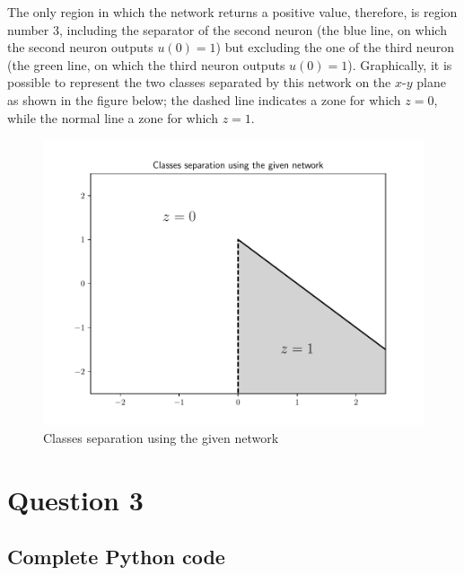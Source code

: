 \documentclass[letterpaper,headings=standardclasses]{scrartcl}
\begin{document}
The only region in which the network returns a positive value, therefore, is region number 3, including the separator of the second neuron (the blue line, on which the second neuron outputs $u(0) = 1$) but excluding the one of the third neuron (the green line, on which the third neuron outputs $u(0) = 1$). Graphically, it is possible to represent the two classes separated by this network on the $x$-$y$ plane as shown in the figure below; the dashed line indicates a zone for which $z = 0$, while the normal line a zone for which $z = 1$.

\begin{figure}[h]
\centering
\includegraphics[width=0.7\linewidth]{net_sep.pdf}
\caption{Classes separation using the given network}
\end{figure}

\section{Question 3}

\subsection{Complete Python code}


\end{document}

